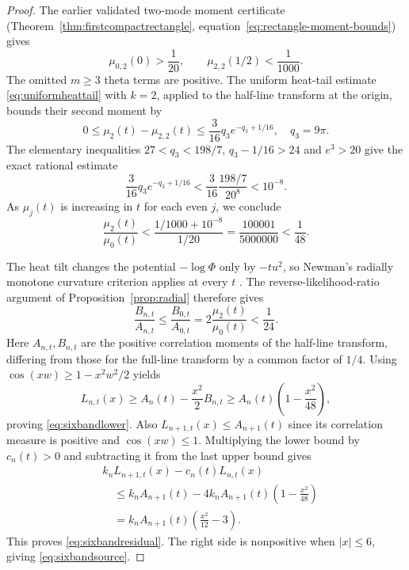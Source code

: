 \begin{proof}
The earlier validated two-mode moment certificate
(Theorem~\ref{thm:firstcompactrectangle},
equation~\eqref{eq:rectangle-moment-bounds}) gives
\[
\mu_{0,2}(0)>\frac1{20},\qquad
\mu_{2,2}(1/2)<\frac1{1000}.
\]
The omitted $m\ge3$ theta terms are positive.
The uniform heat-tail estimate
\eqref{eq:uniformheattail} with $k=2$,
applied to the half-line transform at the origin,
bounds their second moment by
\[
0\le\mu_2(t)-\mu_{2,2}(t)
\le\frac3{16}q_3e^{-q_3+1/16},
\quad q_3=9\pi.
\]
The elementary inequalities
$27<q_3<198/7$, $q_3-1/16>24$
and $e^3>20$ give the exact rational estimate
\[
\frac3{16}q_3e^{-q_3+1/16}
<\frac3{16}\frac{198/7}{20^8}
<10^{-8}.
\]
As $\mu_j(t)$ is increasing in $t$
for each even $j$, we conclude
\begin{equation}\label{eq:sixmomentgate}
\boxed{
\frac{\mu_2(t)}{\mu_0(t)}
<\frac{1/1000+10^{-8}}{1/20}
=\frac{100001}{5000000}<\frac1{48}.}
\end{equation}

The heat tilt changes the potential
$-\log\Phi$ only by $-tu^2$,
so Newman's radially monotone
curvature criterion applies at every $t$
\cite{NewmanGHS}. The reverse-likelihood-ratio
argument of Proposition~\ref{prop:radial}
therefore gives
\[
\frac{B_{n,t}}{A_{n,t}}
\le\frac{B_{0,t}}{A_{0,t}}
=2\frac{\mu_2(t)}{\mu_0(t)}<\frac1{24}.
\]
Here $A_{n,t},B_{n,t}$ are the
positive correlation moments of the
half-line transform, differing from
those for the full-line transform by a
common factor of $1/4$.
Using $\cos(xw)\ge1-x^2w^2/2$ yields
\[
L_{n,t}(x)\ge A_n(t)
-\frac{x^2}{2}B_{n,t}
\ge A_n(t)\left(1-\frac{x^2}{48}\right),
\]
proving \eqref{eq:sixbandlower}.
Also
$L_{n+1,t}(x)\le A_{n+1}(t)$
since its correlation measure is positive
and $\cos(xw)\le1$.
Multiplying the lower bound by $c_n(t)>0$
and subtracting it from the last upper bound gives
\begin{align*}
&k_nL_{n+1,t}(x)-c_n(t)L_{n,t}(x)\\
&\quad\le k_nA_{n+1}(t)
-4k_nA_{n+1}(t)\left(1-\frac{x^2}{48}\right)\\
&\quad=k_nA_{n+1}(t)\left(\frac{x^2}{12}-3\right).
\end{align*}
This proves \eqref{eq:sixbandresidual}.
The right side is nonpositive when $|x|\le6$,
giving \eqref{eq:sixbandsource}.
\end{proof}

